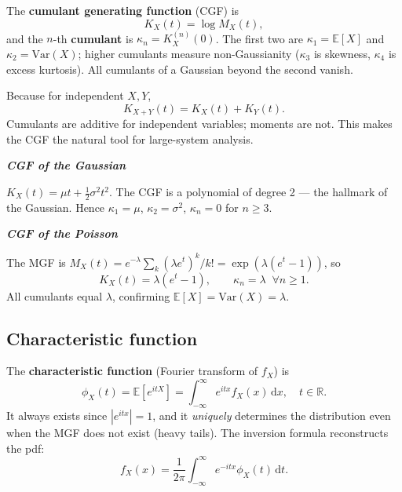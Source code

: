 \documentclass[justified,notoc]{tufte-handout}
\def\d{\mathrm{d}}
\def\E{\mathbb{E}}
\def\var{\mathrm{Var}}
\begin{document}
The \textbf{cumulant generating function} (CGF) is
\begin{equation}
  K_X(t)=\log M_X(t),
  \label{eq:cgf_def}
\end{equation}
and the $n$-th \textbf{cumulant} is $\kappa_n=K_X^{(n)}(0)$. The first two are $\kappa_1=\E[X]$ and $\kappa_2=\var(X)$; higher cumulants measure non-Gaussianity ($\kappa_3$ is skewness, $\kappa_4$ is excess kurtosis). All cumulants of a Gaussian beyond the second vanish.

 Because for independent $X,Y$,
\begin{equation}
  K_{X+Y}(t)=K_X(t)+K_Y(t).
\end{equation}
Cumulants are additive for independent variables; moments are not. This makes the CGF the natural tool for large-system analysis.

\noindent\textit{\textbf{CGF of the Gaussian}}\quad

$K_X(t)=\mu t+\frac{1}{2}\sigma^2 t^2$. The CGF is a polynomial of degree 2 — the hallmark of the Gaussian. Hence $\kappa_1=\mu$, $\kappa_2=\sigma^2$, $\kappa_n=0$ for $n\geq 3$.

\noindent\textit{\textbf{CGF of the Poisson}}\quad

The MGF is $M_X(t)=e^{-\lambda}\sum_k(\lambda e^t)^k/k!=\exp(\lambda(e^t-1))$, so
\begin{equation}
  K_X(t)=\lambda(e^t-1), \qquad \kappa_n=\lambda\;\;\forall n\geq 1.
\end{equation}
All cumulants equal $\lambda$, confirming $\E[X]=\var(X)=\lambda$.

\subsection{Characteristic function}

The \textbf{characteristic function} (Fourier transform of $f_X$) is
\begin{equation}
  \phi_X(t)=\E[e^{itX}]=\int_{-\infty}^{\infty} e^{itx}f_X(x)\,\d x, \quad t\in\mathbb{R}.
  \label{eq:cf_def}
\end{equation}
It always exists since $|e^{itx}|=1$, and it \emph{uniquely} determines the distribution even when the MGF does not exist (heavy tails). The inversion formula reconstructs the pdf:
\begin{equation}
  f_X(x)=\frac{1}{2\pi}\int_{-\infty}^{\infty} e^{-itx}\phi_X(t)\,\d t.
  \label{eq:cf_inversion}
\end{equation}
\end{document}
